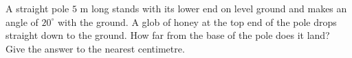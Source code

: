 A straight pole $5$ m long stands with its lower end on level ground and makes an angle of $20^\circ$ with the ground. A glob of honey at the top end of the pole drops straight down to the ground. How far from the base of the pole does it land? Give the answer to the nearest centimetre.
